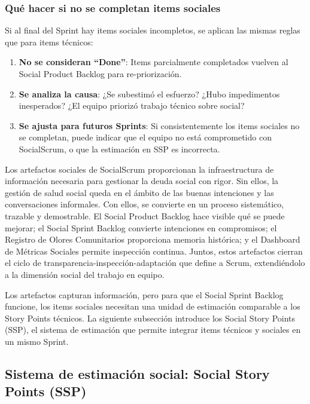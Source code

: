 \subsubsection{Qué hacer si no se completan items sociales}

Si al final del Sprint hay items sociales incompletos, se aplican las mismas reglas que para items técnicos:

\begin{enumerate}
    \item \textbf{No se consideran ``Done''}: Items parcialmente completados vuelven al Social Product Backlog para re-priorización.

    \item \textbf{Se analiza la causa}: ¿Se subestimó el esfuerzo? ¿Hubo impedimentos inesperados? ¿El equipo priorizó trabajo técnico sobre social?

    \item \textbf{Se ajusta para futuros Sprints}: Si consistentemente los items sociales no se completan, puede indicar que el equipo no está comprometido con SocialScrum, o que la estimación en SSP es incorrecta.
\end{enumerate}

Los artefactos sociales de SocialScrum proporcionan la infraestructura de información necesaria para gestionar la deuda social con rigor. Sin ellos, la gestión de salud social queda en el ámbito de las buenas intenciones y las conversaciones informales. Con ellos, se convierte en un proceso sistemático, trazable y demostrable. El Social Product Backlog hace visible qué se puede mejorar; el Social Sprint Backlog convierte intenciones en compromisos; el Registro de Olores Comunitarios proporciona memoria histórica; y el Dashboard de Métricas Sociales permite inspección continua. Juntos, estos artefactos cierran el ciclo de transparencia-inspección-adaptación que define a Scrum, extendiéndolo a la dimensión social del trabajo en equipo.

Los artefactos capturan información, pero para que el Social Sprint Backlog funcione, los items sociales necesitan una unidad de estimación comparable a los Story Points técnicos. La siguiente subsección introduce los Social Story Points (SSP), el sistema de estimación que permite integrar items técnicos y sociales en un mismo Sprint.

\subsection{Sistema de estimación social: Social Story Points (SSP)}
\label{sec:sistema-estimacion-ssp}

